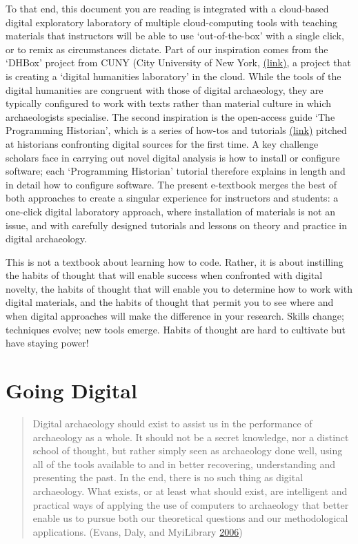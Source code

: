 \documentclass[english,]{book}
\begin{document}
To that end, this document you are reading is integrated with a
cloud-based digital exploratory laboratory of multiple cloud-computing
tools with teaching materials that instructors will be able to use
`out-of-the-box' with a single click, or to remix as circumstances
dictate. Part of our inspiration comes from the `DHBox' project from
CUNY (City University of New York, \href{http://dhbox.org}{(link)}, a
project that is creating a `digital humanities laboratory' in the cloud.
While the tools of the digital humanities are congruent with those of
digital archaeology, they are typically configured to work with texts
rather than material culture in which archaeologists specialise. The
second inspiration is the open-access guide `The Programming Historian',
which is a series of how-tos and tutorials
\href{http://programminghistorian.org}{(link)} pitched at historians
confronting digital sources for the first time. A key challenge scholars
face in carrying out novel digital analysis is how to install or
configure software; each `Programming Historian' tutorial therefore
explains in length and in detail how to configure software. The present
e-textbook merges the best of both approaches to create a singular
experience for instructors and students: a one-click digital laboratory
approach, where installation of materials is not an issue, and with
carefully designed tutorials and lessons on theory and practice in
digital archaeology.

This is not a textbook about learning how to code. Rather, it is about
instilling the habits of thought that will enable success when
confronted with digital novelty, the habits of thought that will enable
you to determine how to work with digital materials, and the habits of
thought that permit you to see where and when digital approaches will
make the difference in your research. Skills change; techniques evolve;
new tools emerge. Habits of thought are hard to cultivate but have
staying power!

\chapter{Going Digital}\label{going-digital}

\begin{quote}
Digital archaeology should exist to assist us in the performance of
archaeology as a whole. It should not be a secret knowledge, nor a
distinct school of thought, but rather simply seen as archaeology done
well, using all of the tools available to and in better recovering,
understanding and presenting the past. In the end, there is no such
thing as digital archaeology. What exists, or at least what should
exist, are intelligent and practical ways of applying the use of
computers to archaeology that better enable us to pursue both our
theoretical questions and our methodological applications. (Evans, Daly,
and MyiLibrary \protect\hyperlink{ref-evans_digital_2006}{2006})
\end{quote}
\end{document}
